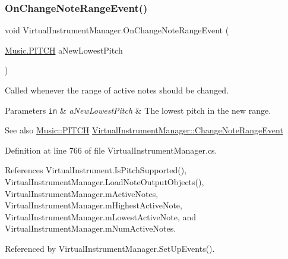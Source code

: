 \subsubsection{\texorpdfstring{On\+Change\+Note\+Range\+Event()}{OnChangeNoteRangeEvent()}}
{\footnotesize\ttfamily void Virtual\+Instrument\+Manager.\+On\+Change\+Note\+Range\+Event (\begin{DoxyParamCaption}\item[{\hyperlink{group___music_enums_ga508f69b199ea518f935486c990edac1d}{Music.\+P\+I\+T\+CH}}]{a\+New\+Lowest\+Pitch }\end{DoxyParamCaption})}



Called whenever the range of active notes should be changed. 


\begin{DoxyParams}[1]{Parameters}
\mbox{\tt in}  & {\em a\+New\+Lowest\+Pitch} & The lowest pitch in the new range.\\
\hline
\end{DoxyParams}
\begin{DoxySeeAlso}{See also}
\hyperlink{group___music_enums_ga508f69b199ea518f935486c990edac1d}{Music\+::\+P\+I\+T\+CH} \hyperlink{group___v_i_m_event_types_class_virtual_instrument_manager_1_1_change_note_range_event}{Virtual\+Instrument\+Manager\+::\+Change\+Note\+Range\+Event} 
\end{DoxySeeAlso}


Definition at line 766 of file Virtual\+Instrument\+Manager.\+cs.



References Virtual\+Instrument.\+Is\+Pitch\+Supported(), Virtual\+Instrument\+Manager.\+Load\+Note\+Output\+Objects(), Virtual\+Instrument\+Manager.\+m\+Active\+Notes, Virtual\+Instrument\+Manager.\+m\+Highest\+Active\+Note, Virtual\+Instrument\+Manager.\+m\+Lowest\+Active\+Note, and Virtual\+Instrument\+Manager.\+m\+Num\+Active\+Notes.



Referenced by Virtual\+Instrument\+Manager.\+Set\+Up\+Events().


